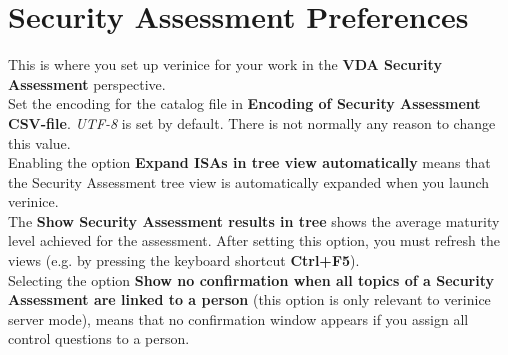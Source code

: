 \documentclass[a4paper,10pt]{book}
\begin{document}
\section{Security Assessment Preferences}
This is where you set up verinice for your work in the \textbf{VDA Security Assessment} perspective.
\newline\\
Set the encoding for the catalog file in \textbf{Encoding of Security Assessment CSV-file}.
{\em UTF-8} is set by default. There is not normally any reason to change this value.
\newline\\
Enabling the option \textbf{Expand ISAs in tree view automatically} means that the Security Assessment
tree view is automatically expanded when you launch verinice.
\newline\\
The \textbf{Show Security Assessment results in tree} shows the average maturity level achieved for the assessment. After setting this option,
you must refresh the views (e.g. by pressing the keyboard shortcut \textbf{Ctrl+F5}).
\newline\\
Selecting the option \textbf{Show no confirmation when all topics of a Security Assessment are linked to a person}
(this option is only relevant to verinice server mode), means that no confirmation window appears if you assign all
control questions to a person.
\end{document}

